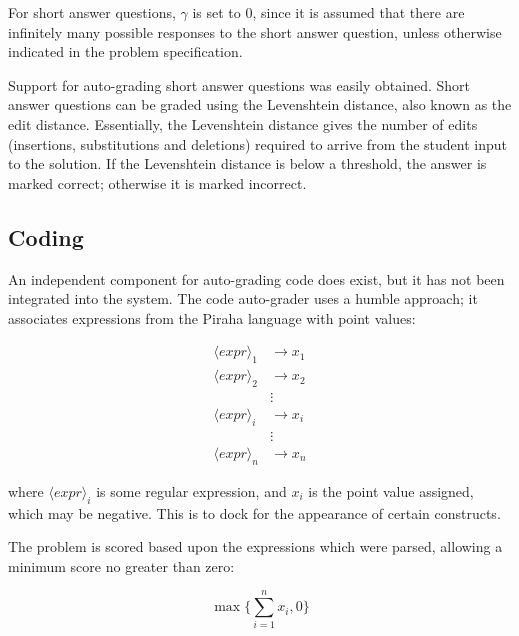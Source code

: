 For short answer questions, $\gamma$ is set to 0, since it is assumed that
there are infinitely many possible responses to the short answer question,
unless otherwise indicated in the problem specification. 

Support for auto-grading short answer questions was easily obtained.  Short
answer questions can be graded using the Levenshtein distance, also known as
the edit distance.  Essentially, the Levenshtein distance gives the number of
edits (insertions, substitutions and deletions) required to arrive from the
student input to the solution.  If the Levenshtein distance is below a
threshold, the answer is marked correct; otherwise it is marked incorrect. 


\subsection{Coding}

An independent component for auto-grading code does exist, but it has not been
integrated into the system.  The code auto-grader uses a humble approach; it
associates expressions from the Piraha language \cite{piraha} with point values:

 \begin{align*}
  \langle expr \rangle_1 & \rightarrow  x_1 \\
  \langle expr \rangle_2 & \rightarrow  x_2 \\
                         & \vdots       \\
  \langle expr \rangle_i & \rightarrow  x_i \\
                         & \vdots       \\
  \langle expr \rangle_n & \rightarrow  x_n 
 \end{align*}

where $\langle expr \rangle_i$ is some regular expression, and $x_i$ is the
point value assigned, which may be negative.  This is to dock for the
appearance of certain constructs.

The problem is scored based upon the expressions which were parsed, allowing
a minimum score no greater than zero:

\begin{equation}
  \max \Bigg\{ \displaystyle\sum_{i=1}^n x_i, 0 \Bigg\}
\end{equation}



